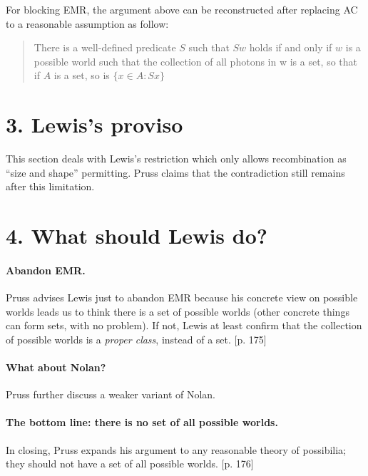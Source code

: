 \documentclass[
10pt, %
a4paper, %
twocolumn, %
landscape %
]{article}
\begin{document}
For blocking EMR, the argument above can be reconstructed after replacing AC to a reasonable assumption as follow:

\begin{quote}
  There is a well-defined predicate $S$ such that $Sw$ holds if and only if $w$ is a possible world such that the collection of all photons in w is a set, so that if $A$ is a set, so is $\{ x \in A : Sx \}$
\end{quote}

\section*{3. Lewis's proviso}
This section deals with Lewis's restriction which only allows recombination as ``size and shape'' permitting. Pruss claims that the contradiction still remains after this limitation.

\section*{4. What should Lewis do?}
\paragraph{Abandon EMR.}
Pruss advises Lewis just to abandon EMR because his concrete view on possible worlds leads us to think there is a set of possible worlds (other concrete things can form sets, with no problem). If not, Lewis at least confirm that the collection of possible worlds is a \emph{proper class}, instead of a set. [p. 175]

\paragraph{What about Nolan?}
Pruss further discuss a weaker variant of Nolan.

\paragraph{The bottom line: there is no set of all possible worlds.}
In closing, Pruss expands his argument to any reasonable theory of possibilia; they should not have a set of all possible worlds.
[p. 176]



\end{document}
